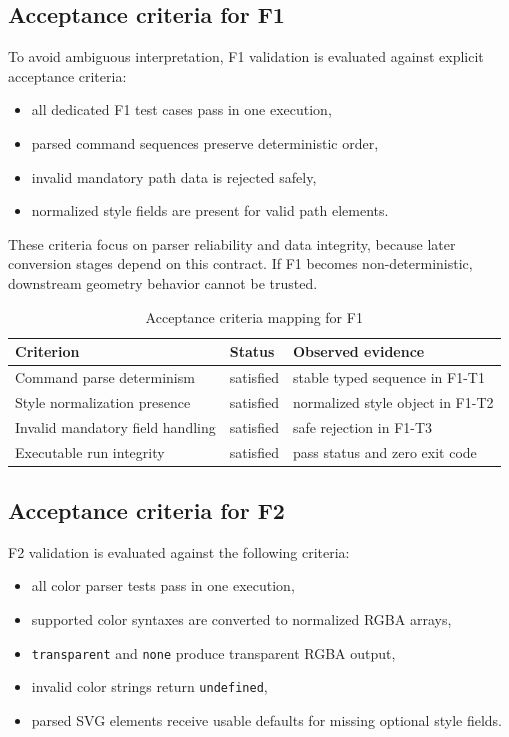 \subsection{Acceptance criteria for F1}

To avoid ambiguous interpretation, F1 validation is evaluated against explicit acceptance criteria:

\begin{itemize}
\item all dedicated F1 test cases pass in one execution,
\item parsed command sequences preserve deterministic order,
\item invalid mandatory path data is rejected safely,
\item normalized style fields are present for valid path elements.
\end{itemize}

These criteria focus on parser reliability and data integrity, because later conversion stages depend on this contract.
If F1 becomes non-deterministic, downstream geometry behavior cannot be trusted.

\begin{table}[htbp]
\centering
\caption{Acceptance criteria mapping for F1}
\label{tab:f1_acceptance_mapping}
\begin{tabular}{>{\raggedright\arraybackslash}p{3.6cm} >{\raggedright\arraybackslash}p{3.2cm} >{\raggedright\arraybackslash}p{5.8cm}}
\toprule
\textbf{Criterion} & \textbf{Status} & \textbf{Observed evidence} \\
\midrule
Command parse determinism & satisfied & stable typed sequence in F1-T1 \\
Style normalization presence & satisfied & normalized style object in F1-T2 \\
Invalid mandatory field handling & satisfied & safe rejection in F1-T3 \\
Executable run integrity & satisfied & pass status and zero exit code \\
\bottomrule
\end{tabular}
\end{table}

\subsection{Acceptance criteria for F2}

F2 validation is evaluated against the following criteria:

\begin{itemize}
\item all color parser tests pass in one execution,
\item supported color syntaxes are converted to normalized RGBA arrays,
\item \texttt{transparent} and \texttt{none} produce transparent RGBA output,
\item invalid color strings return \texttt{undefined},
\item parsed SVG elements receive usable defaults for missing optional style fields.
\end{itemize}

